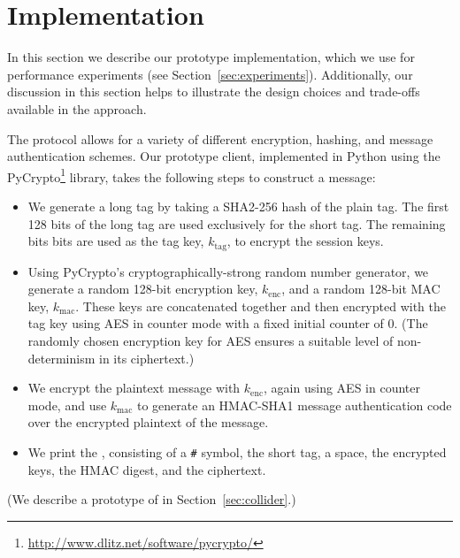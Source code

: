 \section{Implementation}
\label{sec:implementation}

In this section we describe our prototype \hoot implementation, which we
use for performance experiments (see
Section~\ref{sec:experiments}). Additionally, our discussion in this
section helps to illustrate the design choices and trade-offs available
in the \hoot approach.

The \hoot protocol allows for a variety of different encryption,
hashing, and message authentication schemes. Our prototype client,
implemented in Python using the PyCrypto\footnote{\url{http://www.dlitz.net/software/pycrypto/}} library, takes the following steps to construct a message:
\begin{itemize}
\item We generate a long tag by taking a SHA2-256 hash of the plain
  tag. The first 128 bits of the long tag are used exclusively for the
  short tag. The remaining bits
  bits are used as the tag key, $k_{\mathrm{tag}}$, to encrypt the
  session keys.
\item Using PyCrypto's cryptographically-strong random number
  generator, we generate 
  a random 128-bit encryption key, $k_{\mathrm{enc}}$, and a random 128-bit MAC key,
  $k_{\mathrm{mac}}$. These keys are
  concatenated together and then encrypted with the tag key using AES in
  counter mode with a fixed initial counter of $0$. (The randomly
  chosen encryption key for AES ensures a suitable level of
  non-determinism in its ciphertext.)
\item We encrypt the plaintext message with $k_{\mathrm{enc}}$, again using AES in
  counter mode, and use $k_{\mathrm{mac}}$ to generate an HMAC-SHA1
  message authentication code over the encrypted plaintext of the
  message.
\item We print the \hoot, consisting of a {\tt \#} symbol, the short tag,
  a space, the encrypted keys, the HMAC digest, and the ciphertext.
\end{itemize}

(We describe a prototype of  in
Section~\ref{sec:collider}.)

